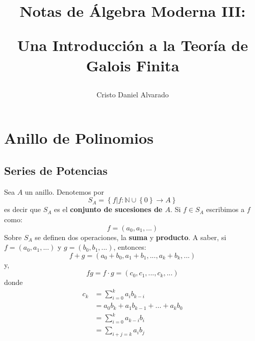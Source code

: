 \documentclass[12pt]{report}
\theoremstyle{largebreak}
\newcommand\cf[3]{\ensuremath{#1:#2\rightarrow#3}}
\begin{document}
    \setlength{\parskip}{5pt} %
    \setlength{\parindent}{12pt} %
    \title{Notas de Álgebra Moderna III:
    
    Una Introducción a la Teoría de Galois Finita}
    \author{Cristo Daniel Alvarado}
    \maketitle

    \tableofcontents %


    \newpage

    \chapter{Anillo de Polinomios}

    \section{Series de Potencias}

    \begin{mydef}
        Sea $A$ un anillo. Denotemos por
        \begin{equation*}
            S_A=\left\{f\Big|\cf{f}{\mathbb{N}\cup\left\{0\right\}}{A} \right\}
        \end{equation*}
        es decir que $S_A$ es el \textbf{conjunto de sucesiones de $A$}. Si $f\in S_A$ escribimos a $f$ como:
        \begin{equation*}
            f=(a_0,a_1,...)
        \end{equation*}
        Sobre $S_A$ se definen dos operaciones, la \textbf{suma} y \textbf{producto}. A saber, si $f=(a_0,a_1,...)$ y $g=(b_0,b_1,...)$, entonces:
        \begin{equation*}
            f+g=(a_0+b_0,a_1+b_1,...,a_k+b_k,...)
        \end{equation*}
        y,
        \begin{equation*}
            fg = f\cdot g = (c_0,c_1,...,c_k,...)
        \end{equation*}
        donde
        \begin{equation*}
            \begin{split}
                c_k&=\sum_{ i=0}^k a_ib_{ k-i}\\
                &=a_0b_k+a_1b_{ k-1}+...+a_kb_0\\
                &=\sum_{ i=0}^k a_{k-i}b_{i}\\
                &=\sum_{ i+j=k}a_ib_j\\
            \end{split}
        \end{equation*}
    \end{mydef}
\end{document}
